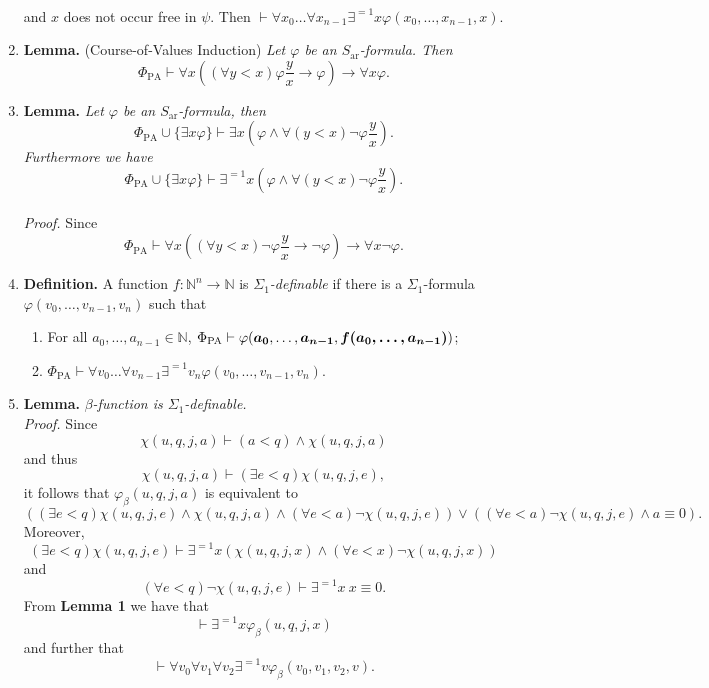 \documentclass[leqno]{report}
\newcommand{\nat}{\mathbb{N}}
\newcommand{\ar}{\mathrm{ar}}
\newcommand{\pa}{\mathrm{PA}}
\newcommand{\mbf}[1]{{\mbox{\boldmath\begin{math}#1\end{math}}}}
\newcommand{\sbst}[2]{{\textstyle\frac{\displaystyle #1}{\displaystyle #2}}}
\begin{document}
\begin{enumerate}[1.]
{\[\begin{array}{rll}
\end{array}
\]
and $x$ does not occur free in $\psi$. Then $\vdash \forall x_0 \ldots \forall x_{n - 1} \exists^{=1} x \varphi (x_0, \ldots, x_{n - 1}, x)$.}
%
\item \textbf{Lemma.} (Course-of-Values Induction) \emph{Let $\varphi$ be an $S_\ar$-formula. Then
\[
\Phi_\pa \vdash \forall x ((\forall y < x)\varphi\sbst{y}{x} \rightarrow \varphi ) \rightarrow \forall x \varphi.
\]}
%
\item \textbf{Lemma.} \emph{Let $\varphi$ be an $S_\ar$-formula, then
\[
\Phi_\pa \cup \{ \exists x \varphi \} \vdash \exists x (\varphi \land \forall (y < x)\neg\varphi\sbst{y}{x}).
\]
Furthermore we have
\[
\Phi_\pa \cup \{ \exists x \varphi \} \vdash \exists^{=1} x (\varphi \land \forall (y < x) \neg\varphi\sbst{y}{x}).
\]}
\ \\
\textit{Proof.} Since
\[
\Phi_\pa \vdash \forall x ((\forall y < x)\neg\varphi\sbst{y}{x} \rightarrow \neg\varphi ) \rightarrow \forall x \neg\varphi.
\]
%
\item \textbf{Definition.} A function $f : \nat^n \to \nat$ is \emph{$\Sigma_1$-definable} if there is a $\Sigma_1$-formula $\varphi(v_0, \ldots, v_{n - 1}, v_n)$ such that
\begin{enumerate}[(1)]
\item For all $a_0, \ldots, a_{n - 1} \in \nat$, $\Phi_\pa \vdash \varphi(\mbf{a_0}, \ldots, \mbf{a_{n - 1}}, \mbf{f(a_0, \ldots, a_{n - 1})})$;
\item $\Phi_\pa \vdash \forall v_0 \ldots \forall v_{n - 1} \exists^{=1} v_n \varphi(v_0, \ldots, v_{n - 1}, v_n)$.
\end{enumerate}
%
\item \textbf{Lemma.} \emph{$\beta$-function is $\Sigma_1$-definable.}\\
\textit{Proof.} Since
\[
\chi (u, q, j, a) \vdash (a < q) \land \chi (u, q, j, a)
\]
and thus
\[
\chi (u, q, j, a) \vdash (\exists e < q) \chi (u, q, j, e),
\]
it follows that $\varphi_\beta (u, q, j, a)$ is equivalent to
\[
((\exists e < q)\chi (u, q, j, e) \land \chi (u, q, j, a) \land (\forall e < a)\neg\chi (u, q, j, e)) \lor ((\forall e < a)\neg\chi (u, q, j, e) \land a \equiv 0).
\]
Moreover,
\[
(\exists e < q)\chi (u, q, j, e) \vdash \exists^{=1}x (\chi (u, q, j, x) \land (\forall e < x)\neg\chi (u, q, j, x))
\]
and
\[
(\forall e < q)\neg\chi (u, q, j, e) \vdash \exists^{=1}x \ x \equiv 0.
\]
From \textbf{Lemma 1} we have that
\[
\vdash \exists^{=1}x \varphi_\beta (u, q, j, x)
\]
and further that
\[
\vdash \forall v_0 \forall v_1 \forall v_2 \exists^{=1}v \varphi_\beta (v_0, v_1, v_2, v).
\]
\end{enumerate}
\end{document}

